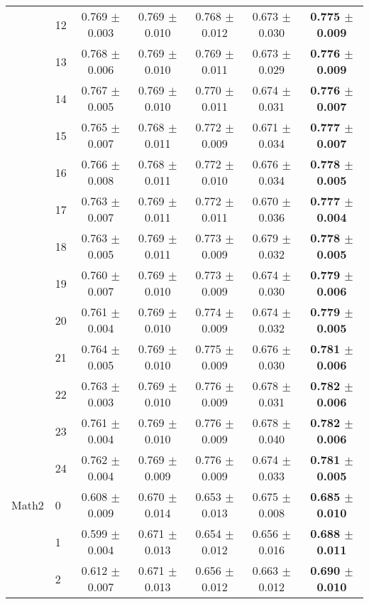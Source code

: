 \begin{table*}[t]
{\begin{tabular}{ll c c c c c}
        & 12 & 0.769 $\pm$ 0.003 & 0.769 $\pm$ 0.010 & 0.768 $\pm$ 0.012 & 0.673 $\pm$ 0.030 & \textbf{0.775 $\pm$ 0.009} \\
        & 13 & 0.768 $\pm$ 0.006 & 0.769 $\pm$ 0.010 & 0.769 $\pm$ 0.011 & 0.673 $\pm$ 0.029 & \textbf{0.776 $\pm$ 0.009} \\
        & 14 & 0.767 $\pm$ 0.005 & 0.769 $\pm$ 0.010 & 0.770 $\pm$ 0.011 & 0.674 $\pm$ 0.031 & \textbf{0.776 $\pm$ 0.007} \\
        & 15 & 0.765 $\pm$ 0.007 & 0.768 $\pm$ 0.011 & 0.772 $\pm$ 0.009 & 0.671 $\pm$ 0.034 & \textbf{0.777 $\pm$ 0.007} \\
        & 16 & 0.766 $\pm$ 0.008 & 0.768 $\pm$ 0.011 & 0.772 $\pm$ 0.010 & 0.676 $\pm$ 0.034 & \textbf{0.778 $\pm$ 0.005} \\
        & 17 & 0.763 $\pm$ 0.007 & 0.769 $\pm$ 0.011 & 0.772 $\pm$ 0.011 & 0.670 $\pm$ 0.036 & \textbf{0.777 $\pm$ 0.004} \\
        & 18 & 0.763 $\pm$ 0.005 & 0.769 $\pm$ 0.011 & 0.773 $\pm$ 0.009 & 0.679 $\pm$ 0.032 & \textbf{0.778 $\pm$ 0.005} \\
        & 19 & 0.760 $\pm$ 0.007 & 0.769 $\pm$ 0.010 & 0.773 $\pm$ 0.009 & 0.674 $\pm$ 0.030 & \textbf{0.779 $\pm$ 0.006} \\
        & 20 & 0.761 $\pm$ 0.004 & 0.769 $\pm$ 0.010 & 0.774 $\pm$ 0.009 & 0.674 $\pm$ 0.032 & \textbf{0.779 $\pm$ 0.005} \\
        & 21 & 0.764 $\pm$ 0.005 & 0.769 $\pm$ 0.010 & 0.775 $\pm$ 0.009 & 0.676 $\pm$ 0.030 & \textbf{0.781 $\pm$ 0.006} \\
        & 22 & 0.763 $\pm$ 0.003 & 0.769 $\pm$ 0.010 & 0.776 $\pm$ 0.009 & 0.678 $\pm$ 0.031 & \textbf{0.782 $\pm$ 0.006} \\
        & 23 & 0.761 $\pm$ 0.004 & 0.769 $\pm$ 0.010 & 0.776 $\pm$ 0.009 & 0.678 $\pm$ 0.040 & \textbf{0.782 $\pm$ 0.006} \\
        & 24 & 0.762 $\pm$ 0.004 & 0.769 $\pm$ 0.009 & 0.776 $\pm$ 0.009 & 0.674 $\pm$ 0.033 & \textbf{0.781 $\pm$ 0.005} \\
\midrule
Math2 & 0 & 0.608 $\pm$ 0.009 & 0.670 $\pm$ 0.014 & 0.653 $\pm$ 0.013 & 0.675 $\pm$ 0.008 & \textbf{0.685 $\pm$ 0.010} \\
        & 1 & 0.599 $\pm$ 0.004 & 0.671 $\pm$ 0.013 & 0.654 $\pm$ 0.012 & 0.656 $\pm$ 0.016 & \textbf{0.688 $\pm$ 0.011} \\
        & 2 & 0.612 $\pm$ 0.007 & 0.671 $\pm$ 0.013 & 0.656 $\pm$ 0.012 & 0.663 $\pm$ 0.012 & \textbf{0.690 $\pm$ 0.010} \\

\end{tabular}}
\end{table*}
